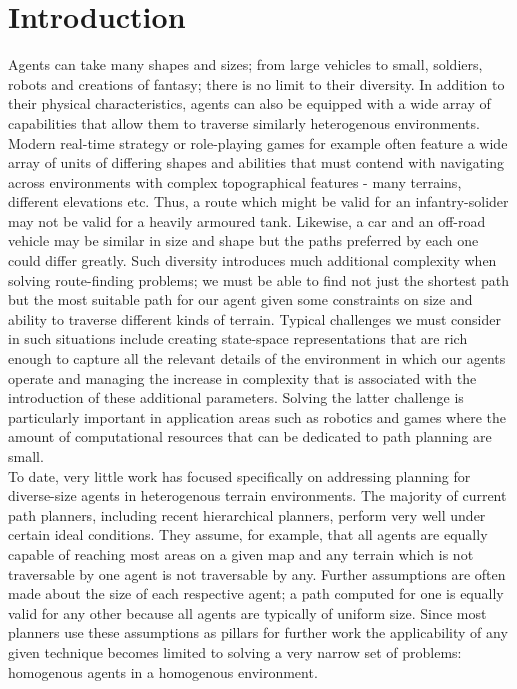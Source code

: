 \section{Introduction}
Agents can take many shapes and sizes; from large vehicles to small, soldiers, robots and creations of fantasy; there is no limit to their diversity. In addition to their physical characteristics, agents can also be equipped with a wide array of capabilities that allow them to traverse similarly heterogenous environments. 
Modern real-time strategy or role-playing games for example often feature a wide array of units of differing shapes and abilities that must contend with navigating across environments with complex topographical features - many terrains, different elevations etc. Thus, a route which might be valid for an infantry-solider may not be valid for a heavily armoured tank. Likewise, a car and an off-road vehicle may be similar in size and shape but the paths preferred by each one could differ greatly. 
Such diversity introduces much additional complexity when solving route-finding problems; we must be able to find not just the shortest path but the most suitable path for our agent given some constraints on size and ability to traverse different kinds of terrain. 
Typical challenges we must consider in such situations include creating state-space representations that are rich enough to capture all the relevant details of the environment in which our agents operate and managing the increase in complexity that is associated with the introduction of these additional parameters. 
Solving the latter challenge is particularly important in application areas such as robotics and games where the amount of computational resources that can be dedicated to path planning are small.\\
To date, very little work has focused specifically on addressing planning for diverse-size agents in heterogenous terrain environments. The majority of current path planners, including recent hierarchical planners, perform very well under certain ideal conditions. They assume, for example, that all agents are equally capable of reaching most areas on a given map and any terrain which is not traversable by one agent is not traversable by any. 
Further assumptions are often made about the size of each respective agent; a path computed for one is equally valid for any other because all agents are typically of uniform size. 
Since most planners use these assumptions as pillars for further work the applicability of any given technique becomes limited to solving a very narrow set of problems: homogenous agents in a homogenous environment. \\
